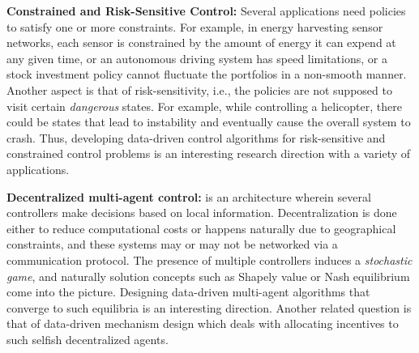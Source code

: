 \documentclass[onecolumn,12pt]{IEEEtran}
\begin{document}
 \textbf{Constrained and Risk-Sensitive Control:} Several applications need policies to satisfy one or more constraints. For example, in energy harvesting sensor networks, each sensor is constrained by the amount of energy it can expend at any given time, or an autonomous driving system has speed limitations, or a stock investment policy cannot fluctuate the portfolios in a non-smooth manner. Another aspect is that of risk-sensitivity, i.e., the policies are not supposed to visit certain \emph{dangerous} states. For example, while controlling a helicopter, there could be states that lead to instability and eventually cause the overall system to crash. Thus, developing data-driven control algorithms for risk-sensitive and constrained control problems is an interesting research direction with a variety of applications.

 
 \textbf{Decentralized multi-agent control:} is an architecture wherein several controllers make decisions based on local information. Decentralization is done either to reduce computational costs or happens naturally due to geographical constraints, and these systems may or may not be networked via a communication protocol. The presence of multiple controllers induces a \emph{stochastic game}, and naturally solution concepts such as Shapely value or Nash equilibrium come into the picture. Designing data-driven multi-agent algorithms that converge to such equilibria is an interesting direction. Another related question is that of data-driven mechanism design which deals with allocating incentives to such selfish decentralized agents.

  
\end{document}
